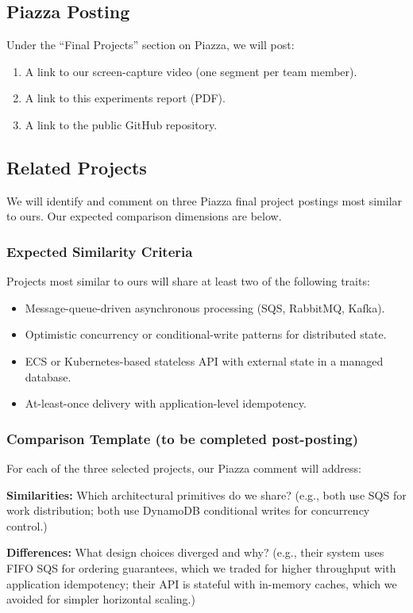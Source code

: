 \documentclass[11pt,letterpaper]{article}
\begin{document}
\subsection{Piazza Posting}
Under the ``Final Projects'' section on Piazza, we will post:
\begin{enumerate}[noitemsep]
  \item A link to our screen-capture video (one segment per team member).
  \item A link to this experiments report (PDF).
  \item A link to the public GitHub repository.
\end{enumerate}

\subsection{Related Projects}

We will identify and comment on three Piazza final project postings most similar to ours. Our expected comparison dimensions are below.

\subsubsection{Expected Similarity Criteria}
Projects most similar to ours will share at least two of the following traits:
\begin{itemize}[noitemsep]
  \item Message-queue-driven asynchronous processing (SQS, RabbitMQ, Kafka).
  \item Optimistic concurrency or conditional-write patterns for distributed state.
  \item ECS or Kubernetes-based stateless API with external state in a managed database.
  \item At-least-once delivery with application-level idempotency.
\end{itemize}

\subsubsection{Comparison Template (to be completed post-posting)}
For each of the three selected projects, our Piazza comment will address:

\textbf{Similarities:} Which architectural primitives do we share? (e.g., both use SQS for work distribution; both use DynamoDB conditional writes for concurrency control.)

\textbf{Differences:} What design choices diverged and why? (e.g., their system uses FIFO SQS for ordering guarantees, which we traded for higher throughput with application idempotency; their API is stateful with in-memory caches, which we avoided for simpler horizontal scaling.)
\end{document}
